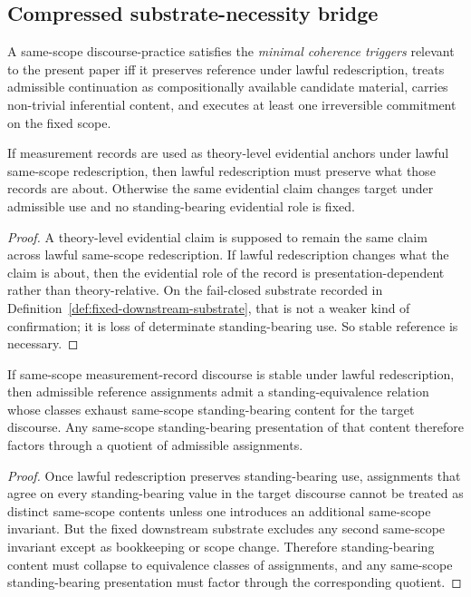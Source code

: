 \subsection{Compressed substrate-necessity bridge}

\begin{definition}
\label{def:minimal-coherence-triggers}
A same-scope discourse-practice satisfies the \emph{minimal coherence triggers} relevant to the
present paper iff it preserves reference under lawful redescription, treats admissible continuation as
compositionally available candidate material, carries non-trivial inferential content, and executes at
least one irreversible commitment on the fixed scope.
\end{definition}

\begin{lemma}
\label{lem:stable-reference-necessary}
If measurement records are used as theory-level evidential anchors under lawful same-scope
redescription, then lawful redescription must preserve what those records are about. Otherwise the
same evidential claim changes target under admissible use and no standing-bearing evidential role is
fixed.
\end{lemma}

\begin{proof}
A theory-level evidential claim is supposed to remain the same claim across lawful same-scope
redescription. If lawful redescription changes what the claim is about, then the evidential role of the
record is presentation-dependent rather than theory-relative. On the fail-closed substrate recorded in
Definition~\ref{def:fixed-downstream-substrate}, that is not a weaker kind of confirmation; it is loss
of determinate standing-bearing use. So stable reference is necessary.
\end{proof}

\begin{lemma}
\label{lem:identity-quotient-necessary}
If same-scope measurement-record discourse is stable under lawful redescription, then admissible
reference assignments admit a standing-equivalence relation whose classes exhaust same-scope
standing-bearing content for the target discourse. Any same-scope standing-bearing presentation of
that content therefore factors through a quotient of admissible assignments.
\end{lemma}

\begin{proof}
Once lawful redescription preserves standing-bearing use, assignments that agree on every
standing-bearing value in the target discourse cannot be treated as distinct same-scope contents unless
one introduces an additional same-scope invariant. But the fixed downstream substrate excludes any
second same-scope invariant except as bookkeeping or scope change. Therefore standing-bearing
content must collapse to equivalence classes of assignments, and any same-scope standing-bearing
presentation must factor through the corresponding quotient.
\end{proof}


